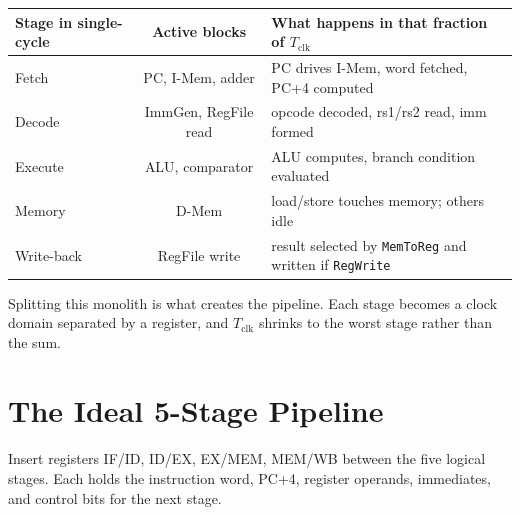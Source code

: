 \begin{center}
\begin{tabular}{lcp{6.2cm}}
\toprule Stage in single-cycle & Active blocks & What happens in that fraction of $T_{\text{clk}}$ \\ \midrule
Fetch & PC, I-Mem, adder & PC drives I-Mem, word fetched, PC+4 computed \\
Decode & ImmGen, RegFile read & opcode decoded, rs1/rs2 read, imm formed \\
Execute & ALU, comparator & ALU computes, branch condition evaluated \\
Memory & D-Mem & load/store touches memory; others idle \\
Write-back & RegFile write & result selected by \texttt{MemToReg} and written if \texttt{RegWrite} \\ \bottomrule
\end{tabular}
\end{center}

Splitting this monolith is what creates the pipeline. Each stage becomes a clock domain separated by a register, and $T_{\text{clk}}$ shrinks to the worst stage rather than the sum.

\section{The Ideal 5-Stage Pipeline}
Insert registers IF/ID, ID/EX, EX/MEM, MEM/WB between the five logical stages. Each holds the instruction word, PC+4, register operands, immediates, and control bits for the next stage.

